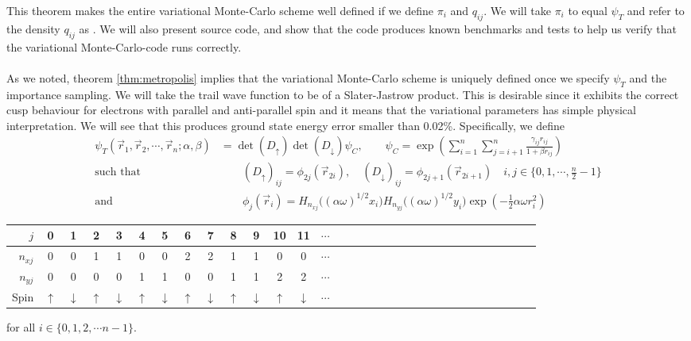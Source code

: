 \documentclass[11pt,english,a4paper]{article}
\begin{document}
This theorem makes the entire variational Monte-Carlo scheme well defined if we define $\pi_i$ and $q_{ij}$. We will take $\pi_i$ to equal $\psi_T$ and refer to the density $q_{ij}$ as . We will also present source code, and show that the code produces known benchmarks and tests to help us verify that the variational Monte-Carlo-code runs correctly.\\
\\
As we noted, theorem \ref{thm:metropolis} implies that the variational Monte-Carlo scheme is uniquely defined once we specify $\psi_T$ and the importance sampling. We will take the trail wave function to be of a Slater-Jastrow product. This is desirable since it exhibits the correct cusp behaviour for electrons with parallel and anti-parallel spin and it means that the variational parameters has simple physical interpretation. We will see that this produces ground state energy error smaller than 0.02\%. Specifically, we define
\begin{align}
\psi_T(\vec{r}_1, \vec{r}_2, \cdots, \vec{r}_n; \alpha,\beta) &= \det(D_\uparrow)\det(D_\downarrow)\psi_C, \qquad \psi_C = \exp\left( \sum_{i=1}^n\sum_{j=i+1}^n \frac{\gamma_{ij} r_{ij}}{1 + \beta  r_{ij}} \right)\\
\text{such that}& \qquad  (D_\uparrow)_{  ij} = \phi_{2j}(\vec{r}_{2i}), \quad (D_\downarrow)_{  ij} = \phi_{2j+1}(\vec{r}_{2i + 1}) \quad i,j \in \{0,1,\cdots,\frac{n}{2}-1\} \nonumber \\
\text{and}& \qquad \phi_{j}(\vec{r}_i) = H_{n_{xj}}\big( (\alpha \omega)^{1/2} x_i\big) H_{n_{yj}}\big( (\alpha \omega)^{1/2} y_i\big) \exp \left( - \frac{1}{2}\alpha \omega r_i^2 \right)
\end{align}
\begin{center}
\begin{tabular}{r |c c c c c c c c c c c c c c c c c c c c c c c c c c c c c c c}
$j$ & 0 & 1 & 2 & 3 & 4 & 5 & 6 & 7 & 8 & 9 & 10 & 11 & $\cdots$ \\
\hline
$n_{xj}$& 0 & 0 & 1 & 1 & 0 & 0 & 2 & 2 & 1 & 1 & 0 & 0 & $\cdots$  \\
$n_{yj}$& 0 & 0 & 0 & 0 & 1 & 1 & 0 & 0 & 1 & 1 & 2 & 2 & $\cdots$ \\
Spin & $\uparrow$ & $\downarrow$& $\uparrow$ & $\downarrow$& $\uparrow$ & $\downarrow$& $\uparrow$ & $\downarrow$& $\uparrow$ & $\downarrow$& $\uparrow$ & $\downarrow$& $\cdots$ 
\end{tabular} \qquad for all $i \in \{0,1,2,\cdots n-1\}$.
\end{center}
\end{document}
